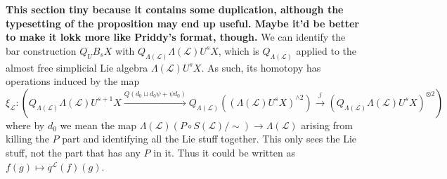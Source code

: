 \documentclass[11pt]{amsart}
\theoremstyle{plain}
\theoremstyle{definition}
\renewcommand{\to}{\longrightarrow}
\newcommand{\scrL}{\mathscr{L}}
\theoremstyle{plain}
\newcommand{\LieOperad}{{\scrL}}
\begin{document}
\begin{Cohomology operations for unstable Lie algebras over P}
{\tiny
\textbf{This section tiny because it contains some duplication, although the typesetting of the proposition may end up useful. Maybe it'd be better to make it lokk more like Priddy's format, though.} We can identify the bar construction $Q_UB_sX$ with
$Q_{\Lambda(\LieOperad)}\Lambda(\LieOperad)U^sX$,
which is $Q_{\Lambda(\LieOperad)}$ applied to the almost free simplicial Lie algebra $\Lambda(\LieOperad)U^sX$. As such, its homotopy has operations induced by the map
\[\xi_\LieOperad:\left(Q_{\Lambda(\LieOperad)}\Lambda(\LieOperad)U^{s+1}X
\overset{Q(d_0\sqcup d_0\psi+\psi d_0)}{\to}
Q_{\Lambda(\LieOperad)}((\Lambda(\LieOperad)U^sX)^{\wedge2})\overset{j}{\to}
(Q_{\Lambda(\LieOperad)}\Lambda(\LieOperad)U^sX)^{\otimes2}\right)\]
where by $d_0$ we mean the map $\Lambda(\LieOperad)(P\circ S(\LieOperad)/\sim)\to \Lambda(\LieOperad)$ arising from killing the $P$ part and identifying all the Lie stuff together. This only sees the Lie stuff, not the part that has any $P$ in it. Thus it could be written as $f(g)\mapsto q^\LieOperad(f)(g)$.

}
\end{Cohomology operations for unstable Lie algebras over P}
\end{document}
